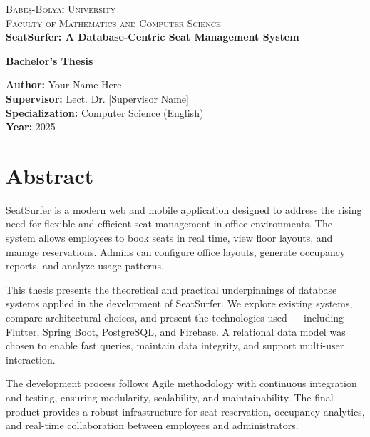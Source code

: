 \documentclass[12pt,a4paper]{report}
\begin{document}
\begin{titlepage}
    \centering
    \textsc{\LARGE Babeș-Bolyai University}\\[0.5cm]
    \textsc{\Large Faculty of Mathematics and Computer Science}\\[1.5cm]

    {\huge\bfseries SeatSurfer: A Database-Centric Seat Management System\\[0.4cm]}

    \vspace{1.5cm}
    \Large
    \textbf{Bachelor’s Thesis}\\[0.5cm]

    \begin{flushleft}
        \textbf{Author:} Your Name Here\\
        \textbf{Supervisor:} Lect. Dr. [Supervisor Name] \\
        \textbf{Specialization:} Computer Science (English) \\
        \textbf{Year:} 2025
    \end{flushleft}

    \vfill
\end{titlepage}

\chapter*{Abstract}

SeatSurfer is a modern web and mobile application designed to address the rising need for flexible and efficient seat management in office environments. The system allows employees to book seats in real time, view floor layouts, and manage reservations. Admins can configure office layouts, generate occupancy reports, and analyze usage patterns.

This thesis presents the theoretical and practical underpinnings of database systems applied in the development of SeatSurfer. We explore existing systems, compare architectural choices, and present the technologies used — including Flutter, Spring Boot, PostgreSQL, and Firebase. A relational data model was chosen to enable fast queries, maintain data integrity, and support multi-user interaction.

The development process follows Agile methodology with continuous integration and testing, ensuring modularity, scalability, and maintainability. The final product provides a robust infrastructure for seat reservation, occupancy analytics, and real-time collaboration between employees and administrators.
\end{document}
